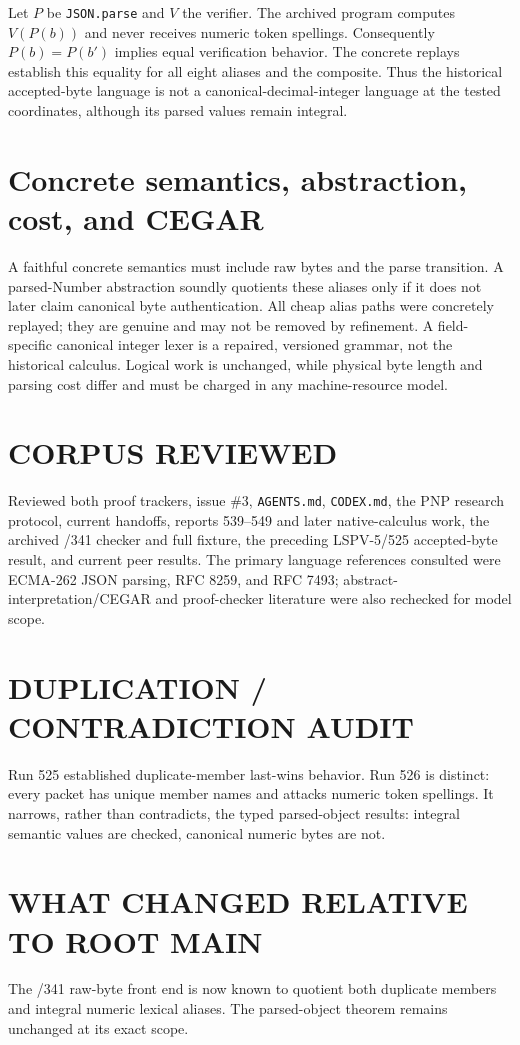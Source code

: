 \documentclass[11pt]{article}
\begin{document}
Let $P$ be \texttt{JSON.parse} and $V$ the verifier. The archived program computes $V(P(b))$ and
never receives numeric token spellings. Consequently $P(b)=P(b')$ implies equal verification
behavior. The concrete replays establish this equality for all eight aliases and the composite.
Thus the historical accepted-byte language is not a canonical-decimal-integer language at the
tested coordinates, although its parsed values remain integral.

\section{Concrete semantics, abstraction, cost, and CEGAR}
A faithful concrete semantics must include raw bytes and the parse transition. A parsed-Number
abstraction soundly quotients these aliases only if it does not later claim canonical byte
authentication. All cheap alias paths were concretely replayed; they are genuine and may not be
removed by refinement. A field-specific canonical integer lexer is a repaired, versioned grammar,
not the historical calculus. Logical work is unchanged, while physical byte length and parsing
cost differ and must be charged in any machine-resource model.

\section{CORPUS REVIEWED}
Reviewed both proof trackers, issue \#3, \texttt{AGENTS.md}, \texttt{CODEX.md}, the PNP research
protocol, current handoffs, reports 539--549 and later native-calculus work, the archived /341
checker and full fixture, the preceding LSPV-5/525 accepted-byte result, and current peer results.
The primary language references consulted were ECMA-262 JSON parsing, RFC 8259, and RFC 7493;
abstract-interpretation/CEGAR and proof-checker literature were also rechecked for model scope.

\section{DUPLICATION / CONTRADICTION AUDIT}
Run 525 established duplicate-member last-wins behavior. Run 526 is distinct: every packet has
unique member names and attacks numeric token spellings. It narrows, rather than contradicts, the
typed parsed-object results: integral semantic values are checked, canonical numeric bytes are not.

\section{WHAT CHANGED RELATIVE TO ROOT MAIN}
The /341 raw-byte front end is now known to quotient both duplicate members and integral numeric
lexical aliases. The parsed-object theorem remains unchanged at its exact scope.
\end{document}
